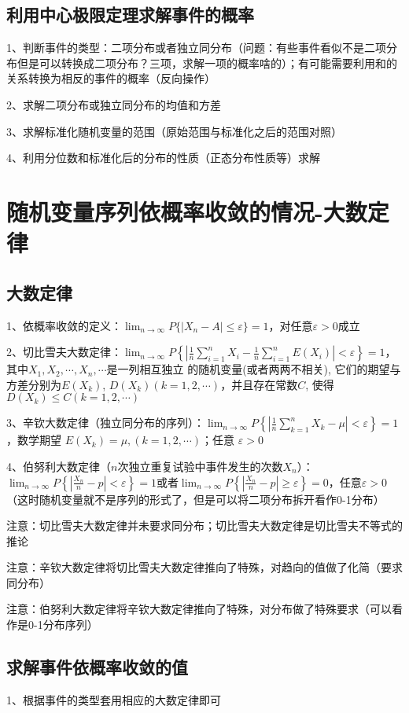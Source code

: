 \subsection{利用中心极限定理求解事件的概率}

1、判断事件的类型：二项分布或者独立同分布（问题：有些事件看似不是二项分布但是可以转换成二项分布？三项，求解一项的概率啥的）；有可能需要利用和的关系转换为相反的事件的概率（反向操作）

2、求解二项分布或独立同分布的均值和方差

3、求解标准化随机变量的范围（原始范围与标准化之后的范围对照）

4、利用分位数和标准化后的分布的性质（正态分布性质等）求解

\section{随机变量序列依概率收敛的情况-大数定律}



\subsection{大数定律}

1、依概率收敛的定义：$\lim_{n \rightarrow \infty} P\{|X_n-A| \le \varepsilon \}=1$，对任意$\varepsilon > 0$成立

2、切比雪夫大数定律：$\lim_{n \rightarrow \infty} P\left\{\left|\frac{1}{n} \sum_{i=1}^{n} X_{i}-\frac{1}{n} \sum_{i=1}^{n} E\left(X_{i}\right)\right|<\varepsilon\right\}=1$，其中$X_{1}, X_{2}, \cdots, X_{n}, \cdots$是一列相互独立 的随机变量(或者两两不相关), 它们的期望与方差分别为$E\left(X_{k}\right)$, $D\left(X_{k}\right)(k=1,2, \cdots)$，并且存在常数$C$, 使得$D\left(X_{k}\right) \leqslant C(k=1,2, \cdots)$

3、辛钦大数定律（独立同分布的序列）：$\lim_{n \rightarrow \infty} P\left\{\left|\frac{1}{n} \sum_{k=1}^{n} X_{k}-\mu\right|<\varepsilon\right\}=1$，数学期望 $E\left(X_{k}\right)=\mu,(k=1,2, \cdots)$；任意 $\varepsilon>0$

4、伯努利大数定律（$n$次独立重复试验中事件发生的次数$X_n$）：$\lim_{n \rightarrow \infty} P\left\{\left|\frac{X_n}{n}-p\right|<\varepsilon\right\}=1$或者$\lim_{n \rightarrow \infty} P\left\{\left|\frac{X_n}{n}-p\right| \geqslant \varepsilon\right\}=0$，任意$\varepsilon>0$（这时随机变量就不是序列的形式了，但是可以将二项分布拆开看作0-1分布）

注意：切比雪夫大数定律并未要求同分布；切比雪夫大数定律是切比雪夫不等式的推论

注意：辛钦大数定律将切比雪夫大数定律推向了特殊，对趋向的值做了化简（要求同分布）

注意：伯努利大数定律将辛钦大数定律推向了特殊，对分布做了特殊要求（可以看作是0-1分布序列）



\subsection{求解事件依概率收敛的值}

1、根据事件的类型套用相应的大数定律即可

